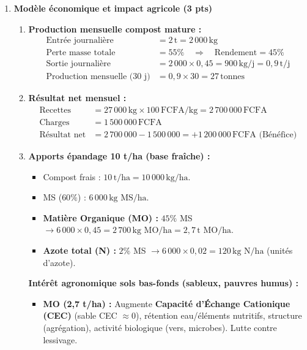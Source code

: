 \documentclass[11pt]{article}
\begin{document}
\begin{corrige}
\begin{enumerate}
    \item \textbf{Modèle économique et impact agricole (3 pts)}
    \begin{enumerate}
        \item \textbf{Production mensuelle compost mature :}
        \begin{align*}
            \text{Entrée journalière} &= 2\,\text{t} = 2\,000\,\text{kg} \\
            \text{Perte masse totale} &= 55\% \quad \Rightarrow \quad \text{Rendement} = 45\% \\
            \text{Sortie journalière} &= 2\,000 \times 0,45 = 900\,\text{kg/j} = 0,9\,\text{t/j} \\
            \text{Production mensuelle (30 j)} &= 0,9 \times 30 = \boxed{27\,\text{tonnes}}
        \end{align*}
        \item \textbf{Résultat net mensuel :}
        \begin{align*}
            \text{Recettes} &= 27\,000\,\text{kg} \times 100\,\text{FCFA/kg} = 2\,700\,000\,\text{FCFA} \\
            \text{Charges} &= 1\,500\,000\,\text{FCFA} \\
            \text{Résultat net} &= 2\,700\,000 - 1\,500\,000 = \boxed{+1\,200\,000\,\text{FCFA (Bénéfice)}}
        \end{align*}
        \item \textbf{Apports épandage 10 t/ha (base fraîche) :}
        \begin{itemize}
            \item Compost frais : $10\,\text{t/ha} = 10\,000\,\text{kg/ha}$.
            \item MS ($60\%$) : $6\,000\,\text{kg MS/ha}$.
            \item \textbf{Matière Organique (MO) :} $45\%$ MS $\rightarrow 6\,000 \times 0,45 = \boxed{2\,700\,\text{kg MO/ha} = 2,7\,\text{t MO/ha}}$.
            \item \textbf{Azote total (N) :} $2\%$ MS $\rightarrow 6\,000 \times 0,02 = \boxed{120\,\text{kg N/ha}}$ (unités d'azote).
        \end{itemize}
        \textbf{Intérêt agronomique sols bas-fonds (sableux, pauvres humus) :}
        \begin{itemize}
            \item \textbf{MO (2,7 t/ha) :} Augmente \textbf{Capacité d'Échange Cationique (CEC)} (sable CEC $\approx 0$), rétention eau/éléments nutritifs, structure (agrégation), activité biologique (vers, microbes). Lutte contre lessivage.

\end{itemize}
\end{enumerate}
\end{enumerate}
\end{corrige}
\end{document}

